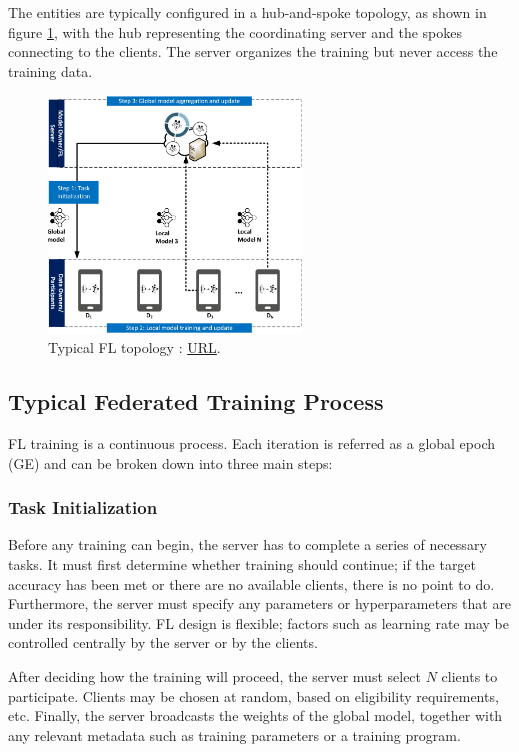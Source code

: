 The entities are typically configured in a hub-and-spoke topology, as shown in figure \ref{fig:FL topology}, with the hub representing the coordinating server and the spokes connecting to the clients. The server organizes the training but never access the training data.
\begin{figure}[H]
    \centering
        \includegraphics[width=0.6\textwidth]{Images/topologies/fl_topology.png}
        \decoRule
        \caption[FL topology]{Typical FL topology \cite{FL_comprehensive_survey}: \href{https://ieeexplore.ieee.org/document/9060868}{URL}.}
        \label{fig:FL topology}
\end{figure}

\subsection{Typical Federated Training Process}
FL training is a continuous process. Each iteration is referred as a global epoch (GE) and can be broken down into three main steps:

\subsubsection{Task Initialization}
Before any training can begin, the server has to complete a series of necessary tasks. It must first determine whether training should continue; if the target accuracy has been met or there are no available clients, there is no point to do. Furthermore, the server must specify any parameters or hyperparameters that are under its responsibility. FL design is flexible; factors such as learning rate may be controlled centrally by the server or by the clients.

After deciding how the training will proceed, the server must select \(N\) clients to participate. Clients may be chosen at random, based on eligibility requirements, etc. Finally, the server broadcasts the weights of the global model, together with any relevant metadata such as training parameters or a training program.


